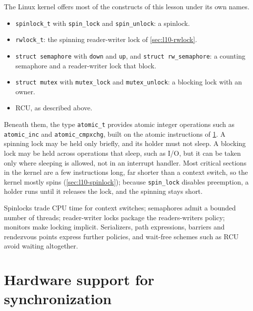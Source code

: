 \documentclass[../main.tex]{subfiles}
\begin{document}
The Linux kernel offers most of the constructs of this lesson under its own
names.
\begin{itemize}
  \item \texttt{spinlock\_t} with \texttt{spin\_lock} and
    \texttt{spin\_unlock}: a spinlock.
  \item \texttt{rwlock\_t}: the spinning reader-writer lock of
    \cref{sec:l10-rwlock}.
  \item \texttt{struct semaphore} with \texttt{down} and \texttt{up}, and
    \texttt{struct rw\_semaphore}: a counting semaphore and a reader-writer
    lock that block.
  \item \texttt{struct mutex} with \texttt{mutex\_lock} and
    \texttt{mutex\_unlock}: a blocking lock with an owner.
  \item RCU, as described above.
\end{itemize}
\begin{sloppypar}\noindent
Beneath them, the type \texttt{atomic\_t} provides atomic integer
operations such as \texttt{atomic\_\allowbreak inc} and \texttt{atomic\_\allowbreak cmpxchg}, built
on the atomic instructions of \cref{sec:l10-hw}.  A spinning lock may be
held only briefly, and its holder must not sleep.  A blocking lock may be
held across operations that sleep, such as I/O, but it can be taken only
where sleeping is allowed, not in an interrupt handler.  Most critical
sections in the kernel are a few instructions long, far shorter than a
context switch, so the kernel mostly spins (\cref{sec:l10-spinlock});
because \texttt{spin\_lock} disables preemption, a holder runs until it
releases the lock, and the spinning stays short.
\end{sloppypar}

\begin{keypoint}
  Spinlocks trade CPU time for context switches; semaphores admit a bounded
  number of threads; reader-writer locks package the readers-writers
  policy; monitors make locking implicit.  Serializers, path expressions,
  barriers and rendezvous points express further policies, and wait-free
  schemes such as RCU avoid waiting altogether.
\end{keypoint}

\section{Hardware support for synchronization}
\label{sec:l10-hw}
\end{document}
